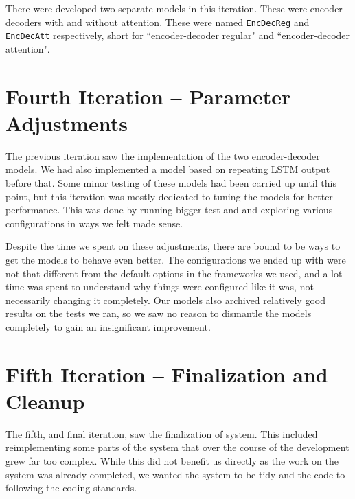 There were developed two separate models in this iteration. These were encoder-decoders with and without attention. These were named {\tt EncDecReg} and {\tt EncDecAtt} respectively, short for ``encoder-decoder regular" and ``encoder-decoder attention".


\section{Fourth Iteration -- Parameter Adjustments}
The previous iteration saw the implementation of the two encoder-decoder models. We had also implemented a model based on repeating LSTM output before that. Some minor testing of these models had been carried up until this point, but this iteration was mostly dedicated to tuning the models for better performance. This was done by running bigger test and and exploring various configurations in ways we felt made sense. 

Despite the time we spent on these adjustments, there are bound to be ways to get the models to behave even better. The configurations we ended up with were not that different from the default options in the frameworks we used, and a lot time was spent to understand why things were configured like it was, not necessarily changing it completely. Our models also archived relatively good results on the tests we ran, so we saw no reason to dismantle the models completely to gain an insignificant improvement.


\section{Fifth Iteration -- Finalization and Cleanup}
The fifth, and final iteration, saw the finalization of system. This included reimplementing some parts of the system that over the course of the development grew far too complex. While this did not benefit us directly as the work on the system was already completed, we wanted the system to be tidy and the code to following the coding standards.